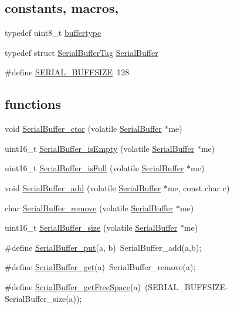 \subsection*{constants, macros,}
\begin{CompactItemize}
\item 
typedef uint8\_\-t \hyperlink{group___serial_g034c66ab1e1a09145312b106c2300a8b}{buffertype}
\item 
typedef struct \hyperlink{struct_serial_buffer_tag}{SerialBufferTag} \hyperlink{group___serial_g36e664fa27ce3c7a3bac11261a96d3fc}{SerialBuffer}
\item 
\#define \hyperlink{group___serial_gd47283ecaa82d1fd076f405ba3172fc1}{SERIAL\_\-BUFFSIZE}~128
\end{CompactItemize}
\subsection*{functions}
\begin{CompactItemize}
\item 
void \hyperlink{group___serial_g4e993e27527b5b7362c46ca16fce9854}{SerialBuffer\_\-ctor} (volatile \hyperlink{struct_serial_buffer_tag}{SerialBuffer} $\ast$me)
\item 
uint16\_\-t \hyperlink{group___serial_g1e7c23fc0a9712d2e3097154c8b85a6f}{SerialBuffer\_\-isEmpty} (volatile \hyperlink{struct_serial_buffer_tag}{SerialBuffer} $\ast$me)
\item 
uint16\_\-t \hyperlink{group___serial_g522e245db6b26c1b5dc72ec08d84e7d0}{SerialBuffer\_\-isFull} (volatile \hyperlink{struct_serial_buffer_tag}{SerialBuffer} $\ast$me)
\item 
void \hyperlink{group___serial_g2b16eeee32d0ed95d1beb03252b10933}{SerialBuffer\_\-add} (volatile \hyperlink{struct_serial_buffer_tag}{SerialBuffer} $\ast$me, const char c)
\item 
char \hyperlink{group___serial_g71d90db4bcb16a30c48d68c8ec1d2df2}{SerialBuffer\_\-remove} (volatile \hyperlink{struct_serial_buffer_tag}{SerialBuffer} $\ast$me)
\item 
uint16\_\-t \hyperlink{group___serial_g069daa68af8643f07570329943ddfed0}{SerialBuffer\_\-size} (volatile \hyperlink{struct_serial_buffer_tag}{SerialBuffer} $\ast$me)
\item 
\#define \hyperlink{group___serial_g8c36b7f3380a02dc72bd23604acb63c5}{SerialBuffer\_\-put}(a, b)~SerialBuffer\_\-add(a,b);
\item 
\#define \hyperlink{group___serial_g557d78acaa759e408254896ba66cbb66}{SerialBuffer\_\-get}(a)~SerialBuffer\_\-remove(a);
\item 
\#define \hyperlink{group___serial_ge32a6db48ef3832f49f6551fcdfa19d9}{SerialBuffer\_\-getFreeSpace}(a)~(SERIAL\_\-BUFFSIZE-SerialBuffer\_\-size(a));
\end{CompactItemize}


